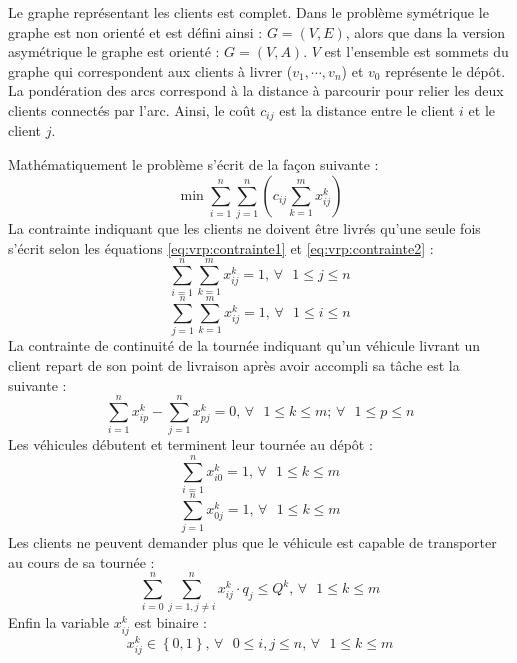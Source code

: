 Le graphe représentant les clients est complet. Dans le problème symétrique le graphe est non orienté et est défini ainsi : $G=(V,E)$, alors que dans la version asymétrique le graphe est orienté : {$G=(V,A)$}. $V$ est l'ensemble est sommets du graphe qui correspondent aux clients à livrer ($v_1, \cdots, v_n$) et $v_0$ représente le dépôt. La pondération des arcs correspond à la distance à parcourir pour relier les deux clients connectés par l'arc. Ainsi, le coût $c_{ij}$ est la distance entre le client $i$ et le client $j$.

Mathématiquement le problème s'écrit de la façon suivante : 
\begin{equation}
 \min \sum \limits_{i=1}^{n} \sum \limits_{j=1}^{n} \left( c_{ij} \sum \limits_{k=1}^{m} x_{ij}^k \right) 
 \label{eq:vrp:cvrp}
\end{equation}
La contrainte indiquant que les clients ne doivent être livrés qu'une seule fois s'écrit selon les équations \ref{eq:vrp:contrainte1} et \ref{eq:vrp:contrainte2} : 
\begin{equation}
 \sum \limits_{i=1}^{n} \sum \limits_{k=1}^{m} x_{ij}^k = 1 \text{, }\forall \text{ } 1 \leq j \leq n
 \label{eq:vrp:contrainte1}
\end{equation}
\begin{equation}
 \sum \limits_{j=1}^{n} \sum \limits_{k=1}^{m} x_{ij}^k = 1 \text{, }\forall \text{ } 1 \leq i \leq n
 \label{eq:vrp:contrainte2}
\end{equation}
La contrainte de continuité de la tournée indiquant qu'un véhicule livrant un client repart de son point de livraison après avoir accompli sa tâche est la suivante : 
\begin{equation}
 \sum \limits_{i=1}^{n} x_{ip}^k - \sum \limits_{j=1}^{n} x_{pj}^k = 0 \text{, }\forall \text{ } 1 \leq k \leq m \text{; } \forall \text{ } 1 \leq p \leq n
 \label{eq:vrp:contrainte3}
\end{equation}
Les véhicules débutent et terminent leur tournée au dépôt :
\begin{equation}
 \sum \limits_{i=1}^{n} x_{i0}^k = 1 \text{, }\forall \text{ } 1 \leq k \leq m
 \label{eq:vrp:contrainte4}
\end{equation}
\begin{equation}
 \sum \limits_{j=1}^{n} x_{0j}^k = 1 \text{, }\forall \text{ } 1 \leq k \leq m
 \label{eq:vrp:contrainte5}
\end{equation}
Les clients ne peuvent demander plus que le véhicule est capable de transporter au cours de sa tournée : 
\begin{equation}
 \sum \limits_{i=0}^{n} \sum \limits_{j=1, j\neq i}^{n} x_{ij}^k \cdot q_j \leq Q^k \text{, }\forall \text{ } 1 \leq k \leq m
 \label{eq:vrp:contrainte6}
\end{equation}
Enfin la variable $x_{ij}^k$ est binaire : 
\begin{equation}
 x_{ij}^k \in \left\{0,1\right\} \text{, } \forall \text{ } 0 \leq i,j \leq n \text{, }\forall \text{ } 1 \leq k \leq m
 \label{eq:vrp:contrainte7}
\end{equation}


